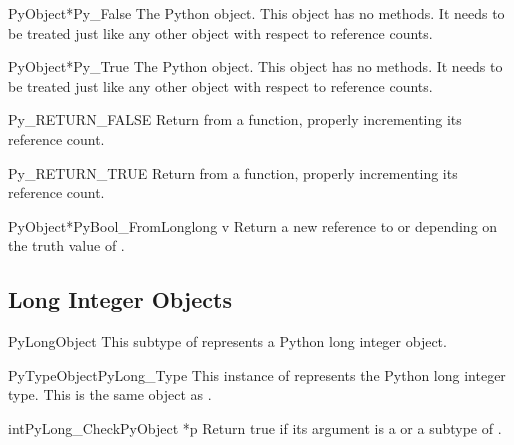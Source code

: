 \begin{cvardesc}{PyObject*}{Py_False}
  The Python  object.  This object has no methods.  It needs to
  be treated just like any other object with respect to reference counts.
\end{cvardesc}

\begin{cvardesc}{PyObject*}{Py_True}
  The Python  object.  This object has no methods.  It needs to
  be treated just like any other object with respect to reference counts.
\end{cvardesc}

\begin{csimplemacrodesc}{Py_RETURN_FALSE}
  Return  from a function, properly incrementing its
  reference count.
\end{csimplemacrodesc}

\begin{csimplemacrodesc}{Py_RETURN_TRUE}
  Return  from a function, properly incrementing its
  reference count.
\end{csimplemacrodesc}

\begin{cfuncdesc}{PyObject*}{PyBool_FromLong}{long v}
  Return a new reference to  or 
  depending on the truth value of .
\end{cfuncdesc}

\subsection{Long Integer Objects \label{longObjects}}

\begin{ctypedesc}{PyLongObject}
  This subtype of  represents a Python long integer
  object.
\end{ctypedesc}

\begin{cvardesc}{PyTypeObject}{PyLong_Type}
  This instance of  represents the Python long
  integer type.  This is the same object as .
\end{cvardesc}

\begin{cfuncdesc}{int}{PyLong_Check}{PyObject *p}
  Return true if its argument is a  or a subtype
  of .
\end{cfuncdesc}

